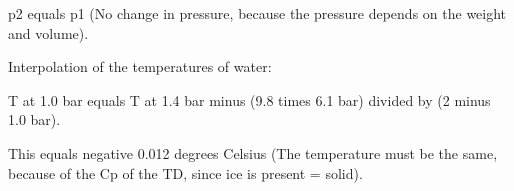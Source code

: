 p2 equals p1 (No change in pressure, because the pressure depends on the weight and volume).

Interpolation of the temperatures of water:

T at 1.0 bar equals T at 1.4 bar minus (9.8 times 6.1 bar) divided by (2 minus 1.0 bar).

This equals negative 0.012 degrees Celsius (The temperature must be the same, because of the Cp of the TD, since ice is present = solid).